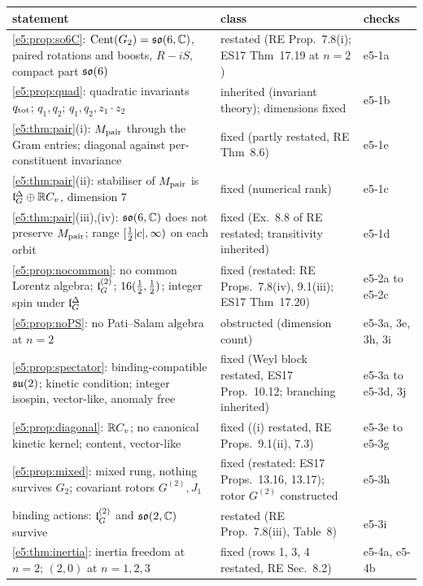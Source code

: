\begin{table}[htbp]
\centering
\footnotesize
\begin{tabular}{@{}>{\raggedright\arraybackslash}p{8.0cm}>{\raggedright\arraybackslash}p{4.7cm}>{\raggedright\arraybackslash}p{2.1cm}@{}}
\toprule
statement & class & checks\\
\midrule
\cref{e5:prop:so6C}: $\operatorname{Cent}(G_2)=\mathfrak{so}(6,\mathbb{C})$, paired rotations and boosts, $R-iS$, compact part $\mathfrak{so}(6)$ & restated (RE Prop.~7.8(i); ES17 Thm~17.19 at $n=2$) & e5-1a\\
\cref{e5:prop:quad}: quadratic invariants $q_{\rm tot}$; $q_1,q_2$; $q_1,q_2,z_1\cdot z_2$ & inherited (invariant theory); dimensions fixed & e5-1b\\
\cref{e5:thm:pair}(i): $M_{\rm pair}$ through the Gram entries; diagonal against per-constituent invariance & fixed (partly restated, RE Thm~8.6) & e5-1e\\
\cref{e5:thm:pair}(ii): stabiliser of $M_{\rm pair}$ is $\mathfrak l_G^\Delta\oplus\mathbb{R} C_v$, dimension $7$ & fixed (numerical rank) & e5-1c\\
\cref{e5:thm:pair}(iii),(iv): $\mathfrak{so}(6,\mathbb{C})$ does not preserve $M_{\rm pair}$; range $[\tfrac12|c|,\infty)$ on each orbit & fixed (Ex.~8.8 of RE restated; transitivity inherited) & e5-1d\\
\cref{e5:prop:nocommon}: no common Lorentz algebra; $\mathfrak l_G^{(2)}$; $16(\tfrac12,\tfrac12)$; integer spin under $\mathfrak l_G^\Delta$ & fixed (restated: RE Props.~7.8(iv), 9.1(iii); ES17 Thm~17.20) & e5-2a to e5-2c\\
\cref{e5:prop:noPS}: no Pati--Salam algebra at $n=2$ & obstructed (dimension count) & e5-3a, 3e, 3h, 3i\\
\cref{e5:prop:spectator}: binding-compatible $\mathfrak{su}(2)$; kinetic condition; integer isospin, vector-like, anomaly free & fixed (Weyl block restated, ES17 Prop.~10.12; branching inherited) & e5-3a to e5-3d, 3j\\
\cref{e5:prop:diagonal}: $\mathbb{R} C_v$; no canonical kinetic kernel; content, vector-like & fixed ((i) restated, RE Props.~9.1(ii), 7.3) & e5-3e to e5-3g\\
\cref{e5:prop:mixed}: mixed rung, nothing survives $G_2$; covariant rotors $G^{(2)},J_1$ & fixed (restated: ES17 Props.~13.16, 13.17); rotor $G^{(2)}$ constructed & e5-3h\\
binding actions: $\mathfrak l_G^{(2)}$ and $\mathfrak{so}(2,\mathbb{C})$ survive & restated (RE Prop.~7.8(iii), Table~8) & e5-3i\\
\cref{e5:thm:inertia}: inertia freedom at $n=2$; $(2,0)$ at $n=1,2,3$ & fixed (rows 1, 3, 4 restated, RE Sec.~8.2) & e5-4a, e5-4b\\

\end{tabular}
\end{table}
